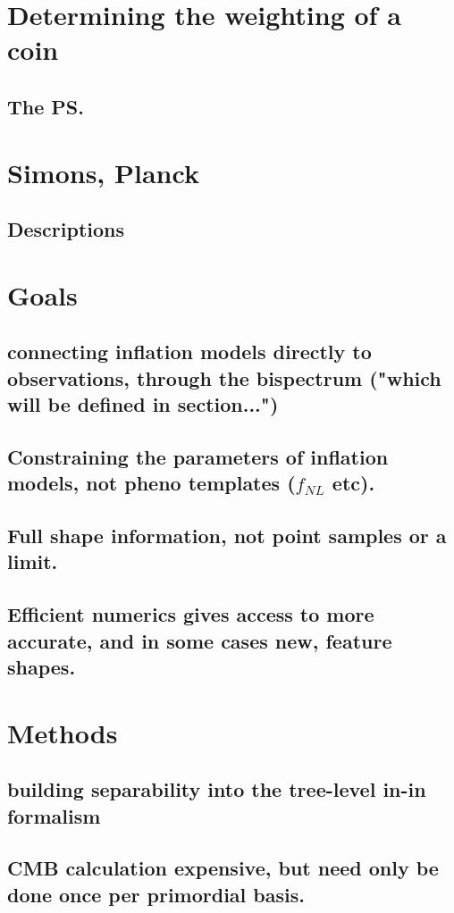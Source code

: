 \section{Determining the weighting of a coin}
    \subsection{The PS.}
\section{Simons, Planck}
    \subsection{Descriptions}
\section{Goals}
    \subsection{connecting inflation models directly to observations, through the bispectrum ("which will be defined in section...")}
    \subsection{Constraining the parameters of inflation models, not pheno templates ($f_{NL}$ etc).}
    \subsection{Full shape information, not point samples or a limit.}
    \subsection{Efficient numerics gives access to more accurate, and in some cases new, feature shapes.}
\section{Methods}
    \subsection{building separability into the tree-level in-in formalism}
    \subsection{CMB calculation expensive, but need only be done once per primordial basis.}
